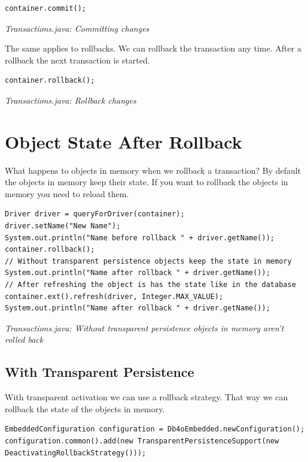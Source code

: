 \begin{lstlisting}
container.commit();
\end{lstlisting}

{\small\itshape Transactions.java: Committing changes\par}
\medskip

The same applies to rollbacks. We can rollback the transaction any time. After a rollback the next transaction is started.

\begin{lstlisting}
container.rollback();
\end{lstlisting}

{\small\itshape Transactions.java: Rollback changes\par}
\medskip

\section{Object State After Rollback}
\label{tut:transactions:objectstate}

What happens to objects in memory when we rollback a transaction? By default the objects in memory keep their state. If you want to rollback the objects in memory you need to reload them.

\begin{lstlisting}
Driver driver = queryForDriver(container);
driver.setName("New Name");
System.out.println("Name before rollback " + driver.getName());
container.rollback();
// Without transparent persistence objects keep the state in memory
System.out.println("Name after rollback " + driver.getName());
// After refreshing the object is has the state like in the database
container.ext().refresh(driver, Integer.MAX_VALUE);
System.out.println("Name after rollback " + driver.getName());
\end{lstlisting}

{\small\itshape Transactions.java: Without transparent persistence objects in memory aren't rolled back\par}
\medskip

\subsection*{With Transparent Persistence}

With transparent activation we can use a rollback strategy. That way we can rollback the state of the objects in memory.

\begin{lstlisting}
EmbeddedConfiguration configuration = Db4oEmbedded.newConfiguration();
configuration.common().add(new TransparentPersistenceSupport(new DeactivatingRollbackStrategy()));
\end{lstlisting}

